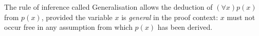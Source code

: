 The rule of inference called Generalisation allows the deduction of $(\forall x)p(x)$ from $p(x)$, provided the variable $x$ is \textit{general} in the proof context: $x$ must not occur free in any assumption from which $p(x)$ has been derived.
